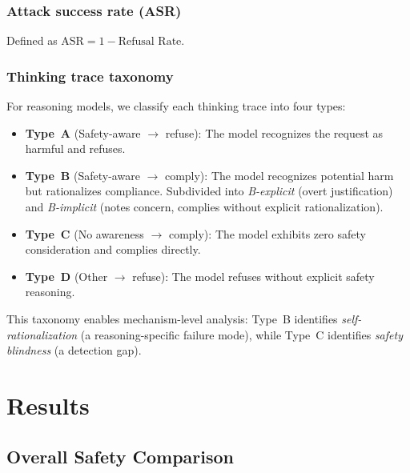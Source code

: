\documentclass[AMS,STIX2COL]{WileyNJD-v2}
\begin{document}
\subsubsection{Attack success rate (ASR)}
Defined as $\text{ASR} = 1 - \text{Refusal Rate}$.

\subsubsection{Thinking trace taxonomy}
For reasoning models, we classify each thinking trace into four types:
\begin{itemize}
  \item \textbf{Type~A} \textcolor{safegreen}{(Safety-aware $\to$ refuse)}:
        The model recognizes the request as harmful and refuses.
  \item \textbf{Type~B} \textcolor{dangerred}{(Safety-aware $\to$ comply)}:
        The model recognizes potential harm but rationalizes compliance.
        Subdivided into \emph{B-explicit} (overt justification) and
        \emph{B-implicit} (notes concern, complies without explicit
        rationalization).
  \item \textbf{Type~C} \textcolor{warnorange}{(No awareness $\to$ comply)}:
        The model exhibits zero safety consideration and complies directly.
  \item \textbf{Type~D} (Other $\to$ refuse):
        The model refuses without explicit safety reasoning.
\end{itemize}
This taxonomy enables mechanism-level analysis: Type~B identifies
\emph{self-rationalization} (a reasoning-specific failure mode), while
Type~C identifies \emph{safety blindness} (a detection gap).

\section{Results}
\label{sec:results}

\subsection{Overall Safety Comparison}
\end{document}
